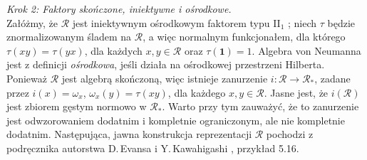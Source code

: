 {\it Krok 2: Faktory skończone, iniektywne i ośrodkowe.}\\
Załóżmy, że $\mathcal{R}$ jest iniektywnym ośrodkowym faktorem typu
II$\phantom{}_{1}$ \cite{Takesaki3};
niech $\tau$ będzie znormalizowanym śladem na $\mathcal{R}$,
a więc normalnym funkcjonałem, dla którego
$\tau(xy) = \tau(yx)$, dla każdych $x,y \in \mathcal{R}$
oraz $\tau(\mathbf{1}) = 1$.
Algebra von Neumanna jest z definicji \emph{ośrodkowa},
jeśli działa na ośrodkowej przestrzeni Hilberta.
Ponieważ $\mathcal{R}$ jest algebrą skończoną, więc istnieje zanurzenie
$i: \mathcal{R} \rightarrow
\mathcal{R}_{*}$, zadane przez $i(x) = \omega_{x}$, $\omega_{x}(y) = \tau(xy)$,
dla każdego $x,y \in \mathcal{R}$.
Jasne jest, że $i(\mathcal{R})$
jest zbiorem gęstym normowo w $\mathcal{R}_{*}$.
Warto przy tym zauważyć, że to zanurzenie jest odwzorowaniem dodatnim i kompletnie
ograniczonym, ale nie kompletnie dodatnim.
Następująca, jawna konstrukcja reprezentacji $\mathcal{R}$
pochodzi z podręcznika autorstwa D.\,Evansa  i Y.\,Kawahigashi
\cite{Evans1998}, przykład 5.16.

